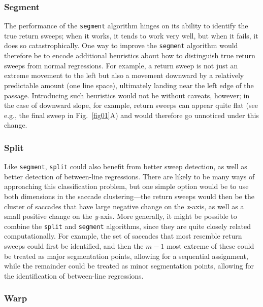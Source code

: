 \documentclass[doc,biblatex]{apa7}
\begin{document}
\subsubsection{Segment}

The performance of the \texttt{segment} algorithm hinges on its ability to identify the true return sweeps; when it works, it tends to work very well, but when it fails, it does so catastrophically. One way to improve the \texttt{segment} algorithm would therefore be to encode additional heuristics about how to distinguish true return sweeps from normal regressions. For example, a return sweep is not just an extreme movement to the left but also a movement downward by a relatively predictable amount (one line space), ultimately landing near the left edge of the passage. Introducing such heuristics would not be without caveats, however; in the case of downward slope, for example, return sweeps can appear quite flat (see e.g., the final sweep in Fig.~\ref{fig01}A) and would therefore go unnoticed under this change.

\subsubsection{Split}

Like \texttt{segment}, \texttt{split} could also benefit from better sweep detection, as well as better detection of between-line regressions. There are likely to be many ways of approaching this classification problem, but one simple option would be to use both dimensions in the saccade clustering---the return sweeps would then be the cluster of saccades that have large negative change on the \textit{x}-axis, as well as a small positive change on the \textit{y}-axis. More generally, it might be possible to combine the \texttt{split} and \texttt{segment} algorithms, since they are quite closely related computationally. For example, the set of saccades that most resemble return sweeps could first be identified, and then the $m-1$ most extreme of these could be treated as major segmentation points, allowing for a sequential assignment, while the remainder could be treated as minor segmentation points, allowing for the identification of between-line regressions.

\subsubsection{Warp}
\end{document}
